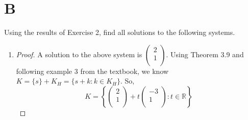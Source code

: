 \documentclass[11pt]{scrartcl}
\begin{document}
\section{B}
Using the results of Exercise 2, find all solutions to the following systems.
\begin{enumerate}[label=\alph*.]

	\item{
		\begin{proof}
			A solution to the above system is  
			$
			\begin{pmatrix}
				2\\
				1\\
			\end{pmatrix}
			$.
			Using Theorem 3.9 and following example 3 from the textbook, we know $K = \{s\} + K_H = \{s + k : k \in K_H \}$.
			So, 
			\[
			K=
			\left\{
				\begin{pmatrix}
					2\\
					1\\
				\end{pmatrix}
				+ 
				t\begin{pmatrix}
					-3\\
					1\\
				\end{pmatrix}: t \in \mathbb{R}
			\right\}
			\]
		\end{proof}
	}
	

\end{enumerate}
\end{document}
